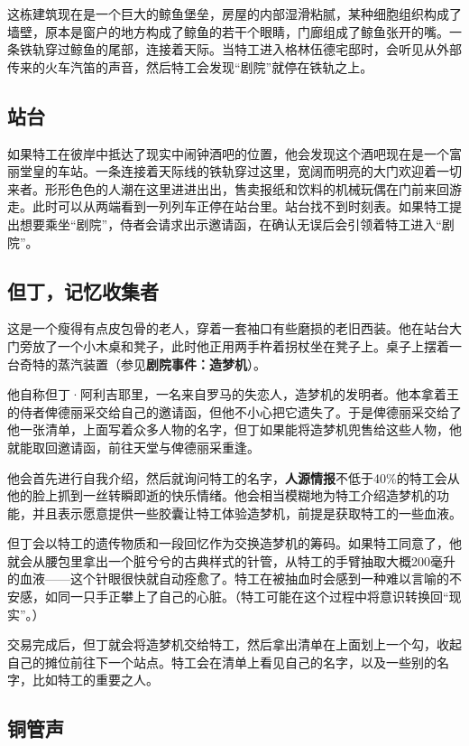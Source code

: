 这栋建筑现在是一个巨大的鲸鱼堡垒，房屋的内部湿滑粘腻，某种细胞组织构成了墙壁，原本是窗户的地方构成了鲸鱼的若干个眼睛，门廊组成了鲸鱼张开的嘴。一条铁轨穿过鲸鱼的尾部，连接着天际。当特工进入格林伍德宅邸时，会听见从外部传来的火车汽笛的声音，然后特工会发现“剧院”就停在铁轨之上。

\subsection{站台}

如果特工在彼岸中抵达了现实中闹钟酒吧的位置，他会发现这个酒吧现在是一个富丽堂皇的车站。一条连接着天际线的铁轨穿过这里，宽阔而明亮的大门欢迎着一切来者。形形色色的人潮在这里进进出出，售卖报纸和饮料的机械玩偶在门前来回游走。此时可以从两端看到一列列车正停在站台里。站台找不到时刻表。如果特工提出想要乘坐“剧院”，侍者会请求出示邀请函，在确认无误后会引领着特工进入“剧院”。

\subsection{但丁，记忆收集者}

这是一个瘦得有点皮包骨的老人，穿着一套袖口有些磨损的老旧西装。他在站台大门旁放了一个小木桌和凳子，此时他正用两手杵着拐杖坐在凳子上。桌子上摆着一台奇特的蒸汽装置（参见\textbf{剧院事件：造梦机}）。

他自称但丁·阿利吉耶里，一名来自罗马的失恋人，造梦机的发明者。他本拿着王的侍者俾德丽采交给自己的邀请函，但他不小心把它遗失了。于是俾德丽采交给了他一张清单，上面写着众多人物的名字，但丁如果能将造梦机兜售给这些人物，他就能取回邀请函，前往天堂与俾德丽采重逢。

他会首先进行自我介绍，然后就询问特工的名字，\textbf{人源情报}不低于40\%的特工会从他的脸上抓到一丝转瞬即逝的快乐情绪。他会相当模糊地为特工介绍造梦机的功能，并且表示愿意提供一些胶囊让特工体验造梦机，前提是获取特工的一些血液。

但丁会以特工的遗传物质和一段回忆作为交换造梦机的筹码。如果特工同意了，他就会从腰包里拿出一个脏兮兮的古典样式的针管，从特工的手臂抽取大概200毫升的血液——这个针眼很快就自动痊愈了。特工在被抽血时会感到一种难以言喻的不安感，如同一只手正攀上了自己的心脏。（特工可能在这个过程中将意识转换回“现实”。）

交易完成后，但丁就会将造梦机交给特工，然后拿出清单在上面划上一个勾，收起自己的摊位前往下一个站点。特工会在清单上看见自己的名字，以及一些别的名字，比如特工的重要之人。

\subsection{铜管声}

